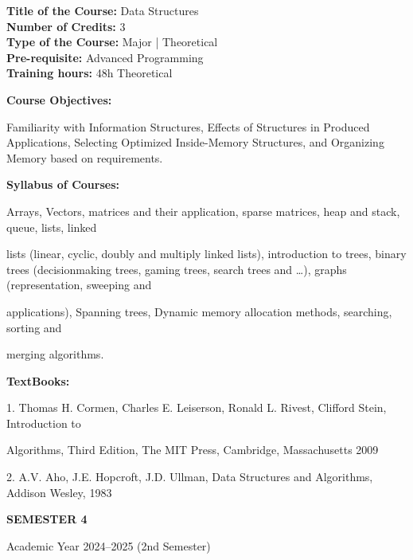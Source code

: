 \documentclass[12pt,a4paper]{article}
\begin{document}
\newpage
\textbf{Title of the Course:} Data Structures\\
\textbf{Number of Credits:} 3\\
\textbf{Type of the Course:} Major | Theoretical\\
\textbf{Pre-requisite:} Advanced Programming\\
\textbf{Training hours:} 48h Theoretical\par\vspace{4pt}
\textbf{Course Objectives:}\par\vspace{2pt}
Familiarity with Information Structures, Effects of Structures in Produced Applications, Selecting
Optimized Inside-Memory Structures, and Organizing Memory based on requirements.\par\vspace{4pt}
\textbf{Syllabus of Courses:}\par\vspace{2pt}
Arrays, Vectors, matrices and their application, sparse matrices, heap and stack, queue, lists, linked\par
lists (linear, cyclic, doubly and multiply linked lists), introduction to trees, binary trees (decisionmaking trees, gaming trees, search trees and …), graphs (representation, sweeping and\par
applications), Spanning trees, Dynamic memory allocation methods, searching, sorting and\par
merging algorithms.\par\vspace{4pt}
\textbf{TextBooks:}\par\vspace{2pt}
1. Thomas H. Cormen, Charles E. Leiserson, Ronald L. Rivest, Clifford Stein, Introduction to\par
Algorithms, Third Edition, The MIT Press, Cambridge, Massachusetts 2009\par
2. A.V. Aho, J.E. Hopcroft, J.D. Ullman, Data Structures and Algorithms, Addison Wesley, 1983\par
\vspace{4pt}

\newpage
\vspace*{\fill}
\begin{center}
  {\fontsize{28pt}{34pt}\selectfont \textbf{SEMESTER 4}}\par\vspace{12pt}
  {\fontsize{13pt}{17pt}\selectfont Academic Year 2024–2025 (2nd Semester)}
\end{center}
\vspace*{\fill}
\end{document}
